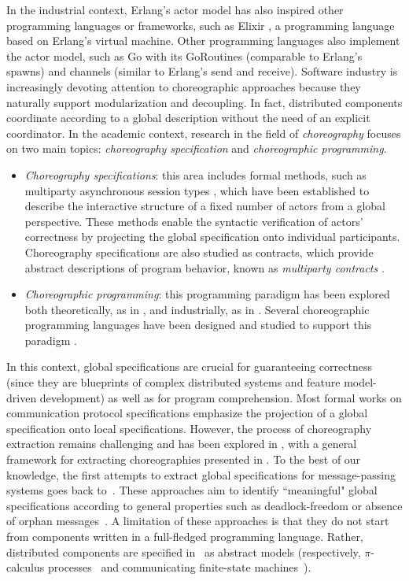 In the industrial context, Erlang's actor model has also inspired other 
programming languages or frameworks, such as Elixir \cite{website:elixir}, a 
programming language based on Erlang's virtual machine. Other programming 
languages also implement the actor model, such as Go \cite{website:golang} with 
its GoRoutines (comparable to Erlang's spawns) and channels (similar to Erlang's
send and receive).
Software industry is increasingly devoting attention to choreographic approaches
\cite{BPMN,bon18,fmmt20,DBLP:journals/software/AutiliIT15} because
they naturally support modularization and decoupling.
%
In fact, distributed components coordinate according to a global
description without the need of an explicit coordinator.
%
In the academic context, research in the field of \textit{choreography} focuses 
on two main topics: \textit{choreography specification} and 
\textit{choreographic programming}.
\begin{itemize}
    \item \textit{Choreography specifications}: this area includes formal 
    methods, such as multiparty asynchronous session types 
    \cite{honda2008multiparty}, which have been established to describe the 
    interactive structure of a fixed number of actors from a global perspective.
    These methods enable the syntactic verification of actors' correctness by 
    projecting the global specification onto individual participants. 
    Choreography specifications are also studied as contracts, which provide 
    abstract descriptions of program behavior, known as \textit{multiparty 
    contracts} \cite{zava}.
    \item \textit{Choreographic programming}: this programming paradigm has been
    explored both theoretically, as in \cite{website:wscdl}, and industrially, 
    as in \cite{website:bpmn}. Several choreographic programming languages have
    been designed and studied to support this paradigm \cite{montesi2010jolie, 
    montesi2014choreographic, giallorenzo2020object, dalla2014aiocj}.
\end{itemize}
In this context, global specifications are crucial for guaranteeing
correctness (since they are blueprints of complex distributed systems
and feature model-driven development) as well as for program
comprehension. 
Most formal works on communication protocol 
specifications emphasize the projection of a global specification onto local 
specifications. However, the process of choreography extraction remains 
challenging and has been explored in \cite{cflm17}, with a general 
framework for extracting choreographies presented in 
\cite{cruz2022implementing}.
%
To the best of our knowledge, the first attempts to extract global
specifications for message-passing systems goes back
to~\cite{myh09,lt12,lty15}.
%
These approaches aim to identify ``meaningful" global specifications
according to general properties such as deadlock-freedom or absence of
orphan messages~\cite{bz83}.
%
A limitation of these approaches is that they do not start from
components written in a full-fledged programming language.
%
Rather, distributed components are specified in~\cite{lt12,lty15} as
abstract models (respectively, $\pi$-calculus
processes~\cite{sw02,mil99,mpw92} and communicating finite-state
machines~\cite{bz83}).


